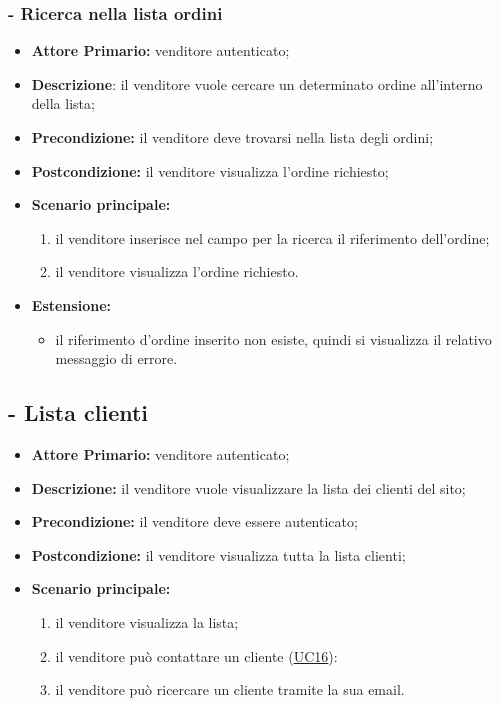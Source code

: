 \stepsubUserCase
\subsubsection{- Ricerca nella lista ordini}
\begin{itemize}
    \item \textbf{Attore Primario:} venditore autenticato;
    \item \textbf{Descrizione}: il venditore vuole cercare un determinato ordine all'interno della lista;
    \item \textbf{Precondizione:} il venditore deve trovarsi nella lista degli ordini;
    \item \textbf{Postcondizione:} il venditore visualizza l'ordine richiesto;
    \item \textbf{Scenario principale:}
        \begin{enumerate}
            \item il venditore inserisce nel campo per la ricerca il riferimento dell'ordine;
            \item il venditore visualizza l'ordine richiesto.
        \end{enumerate}
    \item \textbf{Estensione:}
    \begin{itemize}
        \item il riferimento d'ordine inserito non esiste, quindi si visualizza il relativo messaggio di errore.
    \end{itemize}
\end{itemize}

\stepUserCase
\subsection{ - Lista clienti}
\begin{itemize}
    \item \textbf{Attore Primario:} venditore autenticato;
    \item \textbf{Descrizione:} il venditore vuole visualizzare la lista dei clienti del sito;
    \item \textbf{Precondizione:} il venditore deve essere autenticato;
    \item \textbf{Postcondizione:} il venditore visualizza tutta la lista clienti;
    \item \textbf{Scenario principale:}
          \begin{enumerate}
              \item il venditore visualizza la lista;
              \item il venditore può contattare un cliente (\hyperref[UC16]{UC16}):
              \item il venditore può ricercare un cliente tramite la sua email.
          \end{enumerate}
\end{itemize}

